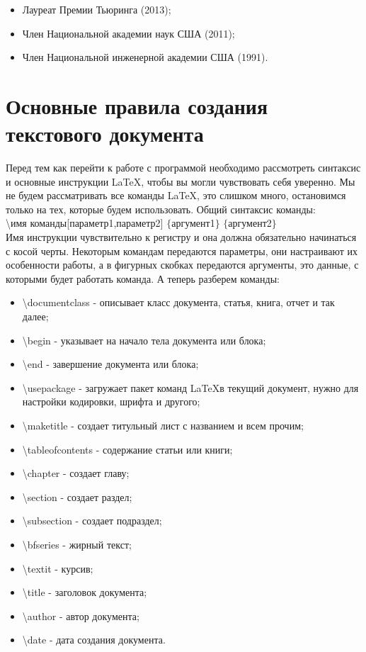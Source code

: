 \documentclass[a4paper,12pt]{article} %
\begin{document}
\begin{itemize}
\item Лауреат Премии Тьюринга (2013);
\item Член Национальной академии наук США (2011);
\item Член Национальной инженерной академии США (1991).
\end{itemize}
\section{Основные правила создания текстового документа}
Перед тем как перейти к работе с программой необходимо рассмотреть синтаксис и основные инструкции \LaTeX , чтобы вы могли чувствовать себя уверенно. Мы не будем рассматривать все команды \LaTeX , это слишком много, остановимся только на тех, которые будем использовать. Общий синтаксис команды:\\

\textbackslash имя команды[параметр1,параметр2] $\lbrace$аргумент1$\rbrace$ $\lbrace$аргумент2$\rbrace$\\

Имя инструкции чувствительно к регистру и она должна обязательно начинаться с косой черты. Некоторым командам передаются параметры, они настраивают их особенности работы, а в фигурных скобках передаются аргументы, это данные, с которыми будет работать команда. А теперь разберем команды:
\begin{itemize}
\item \textbackslash documentclass - описывает класс документа, статья, книга, отчет и так далее;
\item \textbackslash begin - указывает на начало тела документа или блока;
\item \textbackslash end - завершение документа или блока;
\item \textbackslash usepackage - загружает пакет команд \LaTeX  в текущий документ, нужно для настройки кодировки, шрифта и другого;
\item \textbackslash maketitle - создает титульный лист с названием и всем прочим;
\item \textbackslash tableofcontents - содержание статьи или книги;
\item \textbackslash chapter - создает главу;
\item \textbackslash section - создает раздел;
\item \textbackslash subsection - создает подраздел;
\item \textbackslash bfseries - жирный текст;
\item \textbackslash textit - курсив;
\item \textbackslash title - заголовок документа;
\item \textbackslash author - автор документа;
\item \textbackslash date - дата создания документа.
\end{itemize}
\end{document}
